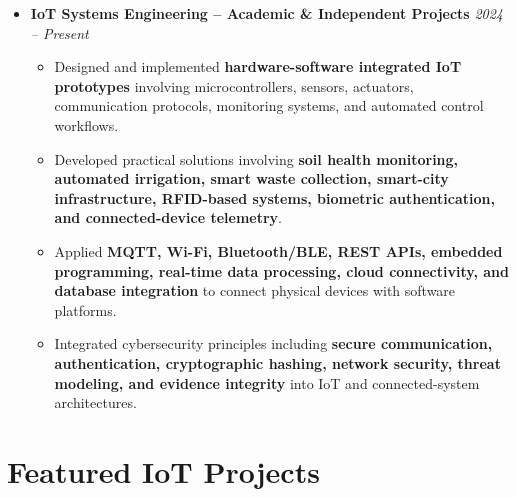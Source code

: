 \documentclass[a4paper,11pt]{article}
\newcommand{\resumeItem}[1]{
    \item \small{#1 \vspace{-2pt}}
}
\begin{document}
\begin{itemize}[leftmargin=0in, label={}]
\begin{itemize}[leftmargin=*]
\resumeItem{Applied the complete IoT development lifecycle including \textbf{system architecture, hardware integration, sensor data acquisition, device communication, edge processing, API development, database integration, testing, debugging, and deployment}.}

\end{itemize}

\vspace{4pt}

\item
\textbf{IoT Systems Engineering -- Academic \& Independent Projects}
\hfill \textit{2024 -- Present}

\begin{itemize}[leftmargin=*]

\resumeItem{Designed and implemented \textbf{hardware-software integrated IoT prototypes} involving microcontrollers, sensors, actuators, communication protocols, monitoring systems, and automated control workflows.}

\resumeItem{Developed practical solutions involving \textbf{soil health monitoring, automated irrigation, smart waste collection, smart-city infrastructure, RFID-based systems, biometric authentication, and connected-device telemetry}.}

\resumeItem{Applied \textbf{MQTT, Wi-Fi, Bluetooth/BLE, REST APIs, embedded programming, real-time data processing, cloud connectivity, and database integration} to connect physical devices with software platforms.}

\resumeItem{Integrated cybersecurity principles including \textbf{secure communication, authentication, cryptographic hashing, network security, threat modeling, and evidence integrity} into IoT and connected-system architectures.}

\end{itemize}

\end{itemize}

\vspace{-10pt}



\section{Featured IoT Projects}
\end{document}
